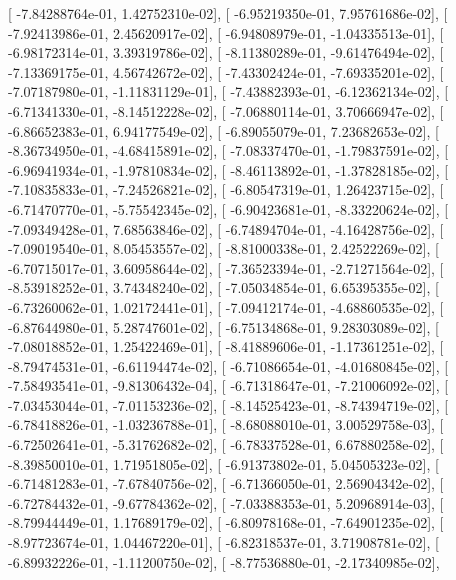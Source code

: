 \documentclass{article}
\begin{document}
       [ -7.84288764e-01,   1.42752310e-02],
       [ -6.95219350e-01,   7.95761686e-02],
       [ -7.92413986e-01,   2.45620917e-02],
       [ -6.94808979e-01,  -1.04335513e-01],
       [ -6.98172314e-01,   3.39319786e-02],
       [ -8.11380289e-01,  -9.61476494e-02],
       [ -7.13369175e-01,   4.56742672e-02],
       [ -7.43302424e-01,  -7.69335201e-02],
       [ -7.07187980e-01,  -1.11831129e-01],
       [ -7.43882393e-01,  -6.12362134e-02],
       [ -6.71341330e-01,  -8.14512228e-02],
       [ -7.06880114e-01,   3.70666947e-02],
       [ -6.86652383e-01,   6.94177549e-02],
       [ -6.89055079e-01,   7.23682653e-02],
       [ -8.36734950e-01,  -4.68415891e-02],
       [ -7.08337470e-01,  -1.79837591e-02],
       [ -6.96941934e-01,  -1.97810834e-02],
       [ -8.46113892e-01,  -1.37828185e-02],
       [ -7.10835833e-01,  -7.24526821e-02],
       [ -6.80547319e-01,   1.26423715e-02],
       [ -6.71470770e-01,  -5.75542345e-02],
       [ -6.90423681e-01,  -8.33220624e-02],
       [ -7.09349428e-01,   7.68563846e-02],
       [ -6.74894704e-01,  -4.16428756e-02],
       [ -7.09019540e-01,   8.05453557e-02],
       [ -8.81000338e-01,   2.42522269e-02],
       [ -6.70715017e-01,   3.60958644e-02],
       [ -7.36523394e-01,  -2.71271564e-02],
       [ -8.53918252e-01,   3.74348240e-02],
       [ -7.05034854e-01,   6.65395355e-02],
       [ -6.73260062e-01,   1.02172441e-01],
       [ -7.09412174e-01,  -4.68860535e-02],
       [ -6.87644980e-01,   5.28747601e-02],
       [ -6.75134868e-01,   9.28303089e-02],
       [ -7.08018852e-01,   1.25422469e-01],
       [ -8.41889606e-01,  -1.17361251e-02],
       [ -8.79474531e-01,  -6.61194474e-02],
       [ -6.71086654e-01,  -4.01680845e-02],
       [ -7.58493541e-01,  -9.81306432e-04],
       [ -6.71318647e-01,  -7.21006092e-02],
       [ -7.03453044e-01,  -7.01153236e-02],
       [ -8.14525423e-01,  -8.74394719e-02],
       [ -6.78418826e-01,  -1.03236788e-01],
       [ -8.68088010e-01,   3.00529758e-03],
       [ -6.72502641e-01,  -5.31762682e-02],
       [ -6.78337528e-01,   6.67880258e-02],
       [ -8.39850010e-01,   1.71951805e-02],
       [ -6.91373802e-01,   5.04505323e-02],
       [ -6.71481283e-01,  -7.67840756e-02],
       [ -6.71366050e-01,   2.56904342e-02],
       [ -6.72784432e-01,  -9.67784362e-02],
       [ -7.03388353e-01,   5.20968914e-03],
       [ -8.79944449e-01,   1.17689179e-02],
       [ -6.80978168e-01,  -7.64901235e-02],
       [ -8.97723674e-01,   1.04467220e-01],
       [ -6.82318537e-01,   3.71908781e-02],
       [ -6.89932226e-01,  -1.11200750e-02],
       [ -8.77536880e-01,  -2.17340985e-02],
\end{document}
